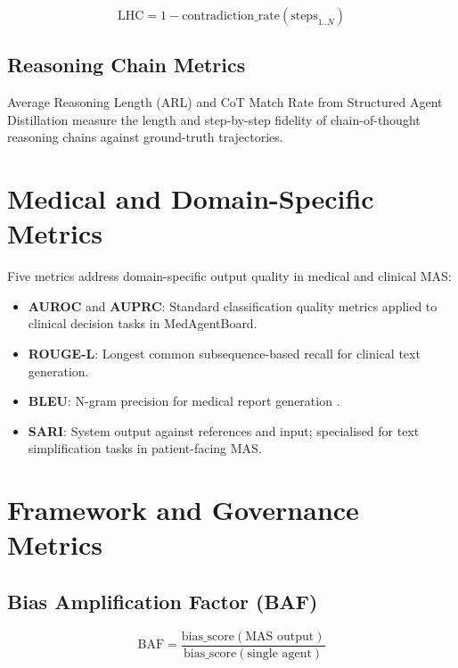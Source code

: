 \documentclass[11pt,a4paper]{article}
\newcommand{\metricname}[1]{\textbf{#1}}
\begin{document}
\begin{equation}
  \text{LHC} = 1 - \text{contradiction\_rate}(\text{steps}_{1..N})
\end{equation}

\subsection{Reasoning Chain Metrics}

Average Reasoning Length (ARL) and CoT Match Rate from Structured Agent Distillation
\citep{structured_distill2025} measure the length and step-by-step fidelity of
chain-of-thought reasoning chains against ground-truth trajectories.

\section{Medical and Domain-Specific Metrics}
\label{sec:medical}

Five metrics address domain-specific output quality in medical and clinical MAS:

\begin{itemize}
  \item \metricname{AUROC} and \metricname{AUPRC}: Standard classification quality
    metrics applied to clinical decision tasks in MedAgentBoard.
  \item \metricname{ROUGE-L}: Longest common subsequence-based recall for clinical
    text generation.
  \item \metricname{BLEU}: N-gram precision for medical report generation
    \citep{medaide2024}.
  \item \metricname{SARI}: System output against references and input; specialised for
    text simplification tasks in patient-facing MAS.
\end{itemize}

\section{Framework and Governance Metrics}
\label{sec:framework}

\subsection{Bias Amplification Factor (BAF)}

\begin{equation}
  \text{BAF} = \frac{\text{bias\_score}(\text{MAS output})}
                    {\text{bias\_score}(\text{single agent})}
\end{equation}
\end{document}
